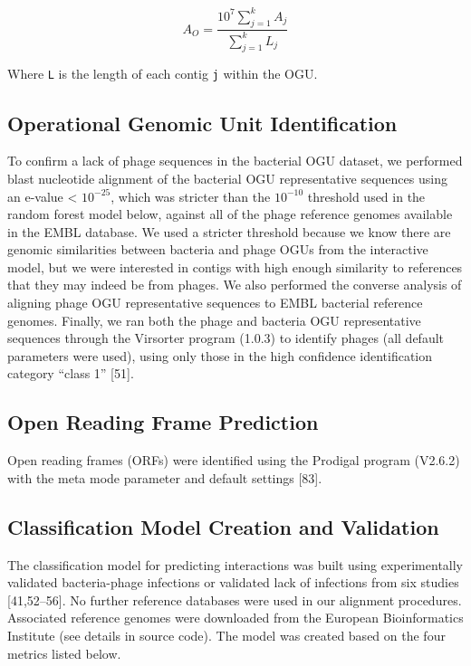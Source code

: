 \documentclass[12pt,]{article}
\begin{document}
\[ { A }_{ O }=\frac { { 10 }^{ 7 }\sum _{ j=1 }^{ k }{ { A }_{ j } }  }{ \sum _{ j=1 }^{ k }{ { L }_{ j } }  } \]

Where \texttt{L} is the length of each contig \texttt{j} within the OGU.

\subsection{Operational Genomic Unit
Identification}\label{operational-genomic-unit-identification}

To confirm a lack of phage sequences in the bacterial OGU dataset, we
performed blast nucleotide alignment of the bacterial OGU representative
sequences using an e-value \textless{} \(10^{-25}\), which was stricter
than the \(10^{-10}\) threshold used in the random forest model below,
against all of the phage reference genomes available in the EMBL
database. We used a stricter threshold because we know there are genomic
similarities between bacteria and phage OGUs from the interactive model,
but we were interested in contigs with high enough similarity to
references that they may indeed be from phages. We also performed the
converse analysis of aligning phage OGU representative sequences to EMBL
bacterial reference genomes. Finally, we ran both the phage and bacteria
OGU representative sequences through the Virsorter program (1.0.3) to
identify phages (all default parameters were used), using only those in
the high confidence identification category ``class 1'' {[}51{]}.

\subsection{Open Reading Frame
Prediction}\label{open-reading-frame-prediction}

Open reading frames (ORFs) were identified using the Prodigal program
(V2.6.2) with the meta mode parameter and default settings {[}83{]}.

\subsection{Classification Model Creation and
Validation}\label{classification-model-creation-and-validation}

The classification model for predicting interactions was built using
experimentally validated bacteria-phage infections or validated lack of
infections from six studies {[}41,52--56{]}. No further reference
databases were used in our alignment procedures. Associated reference
genomes were downloaded from the European Bioinformatics Institute (see
details in source code). The model was created based on the four metrics
listed below.
\end{document}
